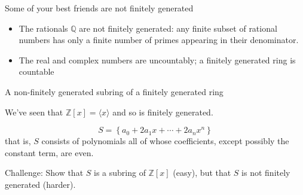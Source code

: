 \documentclass{beamer}
\begin{document}
\begin{frame}{Some of your best friends are not finitely generated}

\begin{itemize} 
\item The rationals $\mathbb{Q}$ are not finitely generated: any finite subset of rational numbers has only a finite number of primes appearing in their denominator.  
\item The real and complex numbers are uncountably; a finitely generated ring is countable
\end{itemize}
\end{frame}

\begin{frame}{A non-finitely generated subring of a finitely generated ring}


We've seen that $\mathbb{Z}[x]=\langle x\rangle$ and so is finitely generated.

$$S=\left\{ a_0+2a_1x+\cdots +2a_nx^n\right\}$$
that is, $S$ consists of polynomials all of whose coefficients, except possibly the constant term, are even.   



\begin{block}{Challenge:}
Show that $S$ is a subring of $\mathbb{Z}[x]$ (easy), but that $S$ is not finitely generated (harder).
\end{block}

\end{frame}
\end{document}
